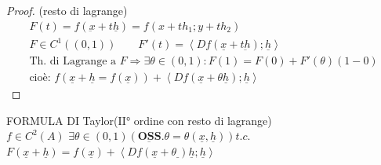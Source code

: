 \documentclass[a4paper, oneside]{article}
\begin{document}
        \begin{proof}
            (resto di lagrange)\\
            \begin{gather*}
                F(t) = f(\underbar{x} + t \underline{h}) = f(x+th_1;y+th_2)\\
                F \in C^1 ((0,1)) \qquad F'(t) = \left\langle Df(\underline{x} + t\underbar{h}) ; \underline{h} \right\rangle\\
                \text{Th. di Lagrange a } F \Rightarrow \exists \theta \in (0,1): F(1) = F(0) + F'(\theta)(1-0)\\
                \text{cioè: }f(\underline{x} + \underline{h} = f(\underline{x})) + \left\langle Df(\underline{x} + \theta \underline{h}); \underline{h} \right\rangle  
            \end{gather*}
        \end{proof}
        \begin{theorem}
            FORMULA DI Taylor(II° ordine con resto di lagrange)\\
            $f \in C^2(A)$  $\exists \theta \in (0,1) (\underbar{\textbf{OSS.}} \theta = \theta (\underline{x}, \underline{h})) t.c.$\\
            $F(\underline{x}+ \underline{h}) = f(\underline{x}) + \left\langle Df(\underline{x}+ \theta \underline{})\underline{h}; \underline{h}\right\rangle $
        \end{theorem}
\end{document}
